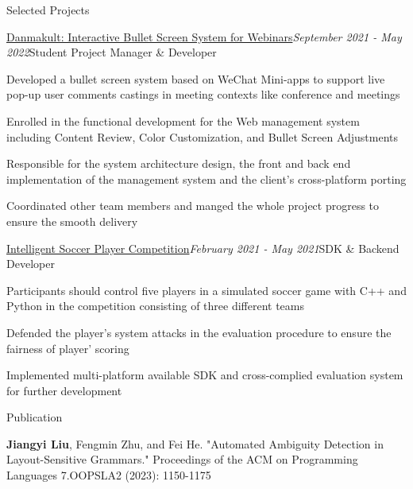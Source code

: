 \documentclass{resume} %
\newcommand{\Feb}{February }
\newcommand{\May}{May }
\newcommand{\Sept}{September }
\begin{document}
\begin{rSection}{Selected Projects}
  
\begin{rSubsection}{\href{https://github.com/panda2134/DanmakuIt}{Danmakult: Interactive Bullet Screen System for Webinars}}{\em \Sept 2021 - \May 2022}{Student Project Manager \& Developer}{}
    
\item Developed a bullet screen system based on WeChat Mini-apps to support live pop-up user comments castings in meeting contexts like conference and meetings
\item Enrolled in the functional development for the Web management system including Content Review, Color Customization, and Bullet Screen Adjustments
\item Responsible for the system architecture design, the front and back end implementation of the management system and the client's cross-platform porting
\item Coordinated other team members and manged the whole project progress to ensure the smooth delivery

\end{rSubsection}

\begin{rSubsection}{\href{https://github.com/ssast-tech/thuai-egg-2021-backend}{Intelligent Soccer Player Competition}}{\em \Feb 2021 - \May 2021}{SDK \& Backend Developer}{}
    
\item Participants should control five players in a simulated soccer game with C++ and Python in the competition consisting of three different teams
\item Defended the player's system attacks in the evaluation procedure to ensure the fairness of player' scoring
\item Implemented multi-platform available SDK and cross-complied evaluation system for further development


\end{rSubsection}

\end{rSection}

\begin{rSection}{Publication}
  

  \textbf{Jiangyi Liu}, Fengmin Zhu, and Fei He. "Automated Ambiguity Detection in Layout-Sensitive Grammars." Proceedings of the ACM on Programming Languages 7.OOPSLA2 (2023): 1150-1175

 
    
\end{rSection}
\end{document}
